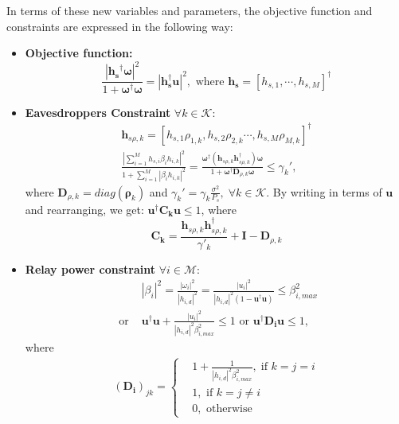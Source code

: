\documentclass[journal,,draftclsnofoot letterpaper, onecolumn]{IEEEtran}
\begin{document}
In terms of these new variables and parameters, the objective function and constraints are expressed in the following way:
\begin{itemize}
\item \textbf{Objective function:}
\begin{equation*}
\frac{|\mathbf{h_s}^\dagger\bm{\omega}|^2}{1+\bm{\omega}^\dagger\bm{\omega}}=|\mathbf{h_s^\dagger u}|^2, \text{ where } \mathbf{h_s}=[h_{s,1},\cdots,h_{s,M}]^\dagger
\end{equation*}

\item \textbf{Eavesdroppers Constraint} $\forall k \in \mathcal{K}$: 
\begin{align*}
\mathbf{h}_{s\rho,k}=[h_{s,1}\rho_{1,k},h_{s,2}\rho_{2,k}\cdots,h_{s,M}\rho_{M,k}]^\dagger\\   
\frac{\left| \sum_{i=1}^{M} h_{s,i} \beta_i h_{i,k}\right| ^2}{1 + \sum_{i=1}^{M}|\beta_ih_{i,k}|^2}=\frac{\bm{\omega}^\dagger(\mathbf{h}_{s\rho,k}\mathbf{h}_{s\rho,k}^\dagger)\bm{\omega}}{1+\bm{\omega}^\dagger \mathbf{D}_{\rho,k}\bm{\omega}}\le \gamma_k',
\end{align*}
where $\mathbf{D}_{\rho,k}=diag(\bm{\rho}_k)$ and $\gamma_k'=\gamma_k\frac{\sigma^2}{P_s},\;\forall k \in \mathcal{K}$. By writing in terms of $\mathbf{u}$ and rearranging, we get: $\mathbf{u}^\dagger\mathbf{C_ku} \le 1$, where 
\begin{equation*}
\mathbf{C_k}=\frac{\mathbf{h}_{s\rho,k}\mathbf{h}_{s\rho,k}^\dagger}{\gamma'_k}+\mathbf{I}-\mathbf{D}_{\rho,k}
\end{equation*}

\item \textbf{Relay power constraint} $\forall i \in \mathcal{M}$: 
\begin{align*}
& |\beta_i|^2=\frac{|\omega_i|^2}{|h_{i,d}|^2}=\frac{|u_i|^2}{|h_{i,d}|^2(1-\mathbf{u^\dagger u})} \le \beta_{i,max}^2\\
\text{ or }& \mathbf{u^\dagger u}+\frac{|u_i|^2}{|h_{i,d}|^2\beta_{i,max}^2} \le 1 \text{ or } \mathbf{u^\dagger D_iu} \le 1,
\end{align*}
where 
\begin{align*}
(\mathbf{D_i})_{jk}=
      \begin{cases}
      & 1+ \frac{1}{|h_{i,d}|^2\beta_{i,max}^2},\;\text{if }k=j=i\\
      & 1 ,\text{ if }k=j\ne i\\
      & 0, \text{ otherwise } 
      \end{cases}
\end{align*}
\end{itemize}
\end{document}
